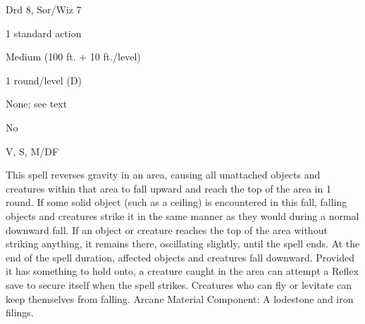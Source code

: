 
\begin{description*}
\item[Level:] Drd 8, Sor/Wiz 7
\item[Casting Time:] 1 standard action
\item[Range:] Medium (100 ft. + 10 ft./level)
\item[Duration:] 1 round/level (D)
\item[Saving Throw:] None; see text
\item[Spell Resistance:] No
\item[Components:] V, S, M/DF
\end{description*}

This spell reverses gravity in an area, causing all unattached objects and creatures
within that area to fall upward and reach the top of the area in 1 round. If some
solid object (such as a ceiling) is encountered in this fall, falling objects and
creatures strike it in the same manner as they would during a normal downward fall.
If an object or creature reaches the top of the area without striking anything,
it remains there, oscillating slightly, until the spell ends. At the end of the
spell duration, affected objects and creatures fall downward.
Provided it has something to hold onto, a creature caught in the area can attempt
a Reflex save to secure itself when the spell strikes. Creatures who can fly or
levitate can keep themselves from falling.
Arcane Material Component: A lodestone and iron filings.